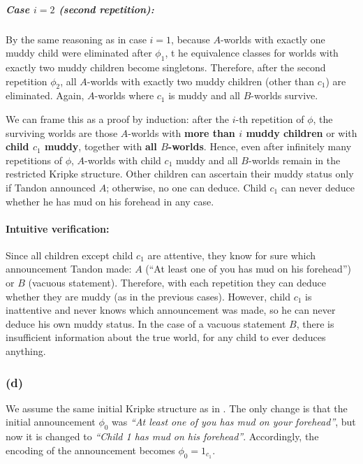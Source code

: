\subparagraph{Case $i=2$ (second repetition):} 
By the same reasoning as in case $i=1$, because $A$-worlds 
with exactly one muddy child were eliminated after $\phi_1$, t
he equivalence classes for worlds with exactly two muddy children 
become singletons. Therefore, after the second repetition $\phi_2$, 
all $A$-worlds with exactly two muddy children (other than $c_1$) 
are eliminated. Again, $A$-worlds where $c_1$ is muddy and 
all $B$-worlds survive.

We can frame this as a proof by induction: after the $i$-th repetition of 
$\phi$, the surviving worlds are those $A$-worlds with 
\textbf{more than $i$ muddy children} or with \textbf{child $c_1$ muddy}, 
together with \textbf{all $B$-worlds}. Hence, even after infinitely 
many repetitions of $\phi$, $A$-worlds with child $c_1$ muddy and 
all $B$-worlds remain in the restricted Kripke structure. 
Other children can ascertain their muddy status only if 
Tandon announced $A$; otherwise, no one can deduce. 
Child $c_1$ can never deduce whether he has mud on his forehead in any case.

\paragraph{Intuitive verification:} 
Since all children except child $c_1$ are attentive, 
they know for sure which announcement Tandon made: $A$ 
(``At least one of you has mud on his forehead'') or 
$B$ (vacuous statement). Therefore, with each repetition 
they can deduce whether they are muddy (as in the previous cases). 
However, child $c_1$ is inattentive and never knows which 
announcement was made, 
so he can never deduce his own muddy status. 
In the case of a vacuous statement $B$, there is insufficient 
information about the true world, for any child to ever deduces anything.

\subsubsection*{(d)}

We assume the same initial Kripke structure as in . 
The only change is that the initial announcement $\phi_0$ was 
\emph{``At least one of you has mud on your forehead''}, but now it is 
changed to \emph{``Child 1 has mud on his forehead''}. 
Accordingly, the encoding of the announcement becomes $\phi_0 = 1_{c_1}$.

